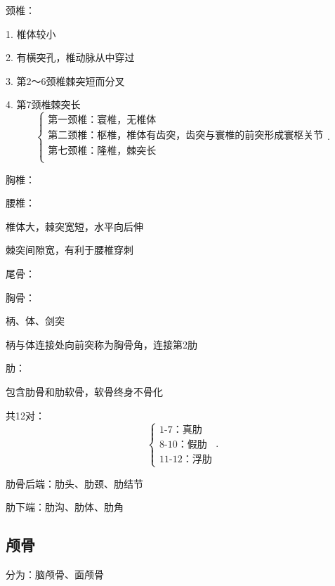 \begin{notation}
    颈椎：

    1. 椎体较小
    
    2. 有横突孔，椎动脉从中穿过

    3. 第2～6颈椎棘突短而分叉

    4. 第7颈椎棘突长
    \[
        \begin{cases}
            \mbox{第一颈椎：寰椎，无椎体}\\ 
            \mbox{第二颈椎：枢椎，椎体有齿突，齿突与寰椎的前突形成寰枢关节}\\ 
            \mbox{第七颈椎：隆椎，棘突长}\\ 
        \end{cases}
    .\] 
\end{notation}

\begin{notation}
    胸椎：
\end{notation}

\begin{notation}
    腰椎：

    椎体大，棘突宽短，水平向后伸

    棘突间隙宽，有利于腰椎穿刺
\end{notation}

\begin{notation}
    尾骨：
\end{notation}

\begin{notation}
    胸骨：

    柄、体、剑突

    柄与体连接处向前突称为胸骨角，连接第2肋
\end{notation}

\begin{notation}
    肋：

    包含肋骨和肋软骨，软骨终身不骨化

    共12对：
    \[
        \begin{cases}
            \mbox{1-7：真肋}\\ 
            \mbox{8-10：假肋}\\ 
            \mbox{11-12：浮肋}
        \end{cases}
    .\] 

    肋骨后端：肋头、肋颈、肋结节

    肋下端：肋沟、肋体、肋角
\end{notation}

\subsection{颅骨}%
\label{sub:颅骨}
分为：脑颅骨、面颅骨

